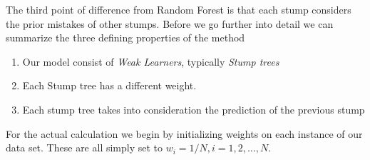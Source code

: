 The third point of difference from Random Forest is that each stump considers the prior mistakes of other stumps. Before we go further into detail we can summarize the three defining properties of the method

\begin{enumerate}
    \item Our model consist of \textit{Weak Learners}, typically \textit{Stump trees}
    \item Each Stump tree has a different weight.
    \item Each stump tree takes into consideration the prediction of the previous stump
\end{enumerate}

For the actual calculation we begin 
by initializing weights on each instance of our data set. These are all simply set to $w_{i}=1 / N, i=1,2, \ldots, N$.

